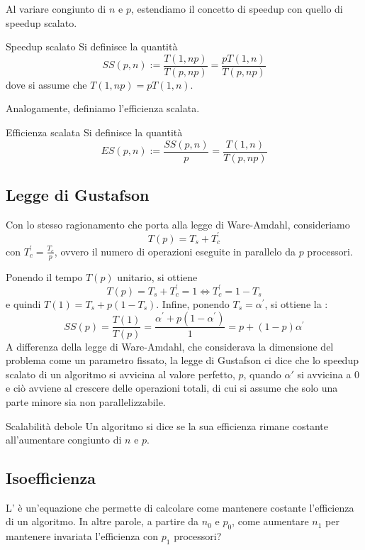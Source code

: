 Al variare congiunto di $n$ e $p$, estendiamo il concetto di speedup con quello di speedup scalato.

\begin{definition}{Speedup scalato}
Si definisce  la quantità
$$SS(p,n) := \frac{T(1,np)}{T(p,np)} =\frac{pT(1,n)}{T(p,np)}$$
dove si assume che $T(1,np) = pT(1,n)$. 
\end{definition}

Analogamente, definiamo l'efficienza scalata.

\begin{definition}{Efficienza scalata}
Si definisce  la quantità
$$ES(p,n) := \frac{SS(p,n)}{p} = \frac{T(1,n)}{T(p,np)}$$
\end{definition}

\subsection{Legge di Gustafson}
Con lo stesso ragionamento che porta alla legge di Ware-Amdahl, consideriamo $$T(p) = T_s + T_c^{'}$$
con $T_c^{'} = \frac{T_c}{p}$, ovvero il numero di operazioni eseguite in parallelo da $p$ processori.

Ponendo il tempo $T(p)$ unitario, si ottiene 
$$T(p) = T_s + T_c^{'} = 1 \iff T_c^{'} = 1 - T_s$$
e quindi $T(1) = T_s + p(1-T_s)$. Infine, ponendo $T_s = \alpha^{'}$, si ottiene la :
$$SS(p) = \frac{T(1)}{T(p)} = \frac{\alpha^{'} + p(1-\alpha^{'})}{1} = p+(1-p)\alpha^{'}$$
A differenza della legge di Ware-Amdahl, che considerava la dimensione del problema come un parametro fissato, la legge di Gustafson ci dice che lo speedup scalato di un algoritmo si avvicina al valore perfetto, $p$, quando $\alpha'$ si avvicina a $0$ e ciò avviene al crescere delle operazioni totali, di cui si assume che solo una parte minore sia non parallelizzabile.

\begin{definition}{Scalabilità debole}
Un algoritmo si dice  se la sua efficienza rimane costante all'aumentare congiunto di $n$ e $p$.
\end{definition}

\subsection{Isoefficienza}
L' è un'equazione che permette di calcolare come mantenere costante l'efficienza di un algoritmo. In altre parole, a partire da $n_{0}$ e $p_{0}$, come aumentare $n_{1}$ per mantenere invariata l'efficienza con $p_{1}$ processori?

